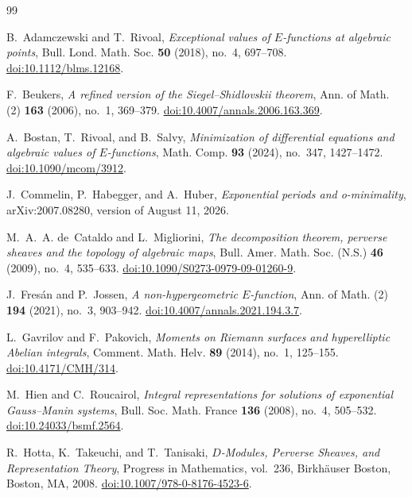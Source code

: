 \documentclass[11pt]{article}
\numberwithin{equation}{section}
\theoremstyle{definition}
\theoremstyle{remark}
\begin{document}
\small
\begin{thebibliography}{99}

B.~Adamczewski and T.~Rivoal,
\emph{Exceptional values of $E$-functions at algebraic points},
Bull. Lond. Math. Soc. \textbf{50} (2018), no.~4, 697--708.
\href{https://doi.org/10.1112/blms.12168}{doi:10.1112/blms.12168}.

F.~Beukers,
\emph{A refined version of the Siegel--Shidlovskii theorem},
Ann. of Math. (2) \textbf{163} (2006), no.~1, 369--379.
\href{https://doi.org/10.4007/annals.2006.163.369}{doi:10.4007/annals.2006.163.369}.

A.~Bostan, T.~Rivoal, and B.~Salvy,
\emph{Minimization of differential equations and algebraic values of
$E$-functions},
Math. Comp. \textbf{93} (2024), no.~347, 1427--1472.
\href{https://doi.org/10.1090/mcom/3912}{doi:10.1090/mcom/3912}.

J.~Commelin, P.~Habegger, and A.~Huber,
\emph{Exponential periods and o-minimality},
arXiv:2007.08280, version of August 11, 2026.

M.~A.~A. de~Cataldo and L.~Migliorini,
\emph{The decomposition theorem, perverse sheaves and the topology of
algebraic maps},
Bull. Amer. Math. Soc. (N.S.) \textbf{46} (2009), no.~4, 535--633.
\href{https://doi.org/10.1090/S0273-0979-09-01260-9}{doi:10.1090/S0273-0979-09-01260-9}.

J.~Fres\'an and P.~Jossen,
\emph{A non-hypergeometric $E$-function},
Ann. of Math. (2) \textbf{194} (2021), no.~3, 903--942.
\href{https://doi.org/10.4007/annals.2021.194.3.7}{doi:10.4007/annals.2021.194.3.7}.

L.~Gavrilov and F.~Pakovich,
\emph{Moments on Riemann surfaces and hyperelliptic Abelian integrals},
Comment. Math. Helv. \textbf{89} (2014), no.~1, 125--155.
\href{https://doi.org/10.4171/CMH/314}{doi:10.4171/CMH/314}.

M.~Hien and C.~Roucairol,
\emph{Integral representations for solutions of exponential Gauss--Manin
systems},
Bull. Soc. Math. France \textbf{136} (2008), no.~4, 505--532.
\href{https://doi.org/10.24033/bsmf.2564}{doi:10.24033/bsmf.2564}.

R.~Hotta, K.~Takeuchi, and T.~Tanisaki,
\emph{$D$-Modules, Perverse Sheaves, and Representation Theory},
Progress in Mathematics, vol.~236,
Birkh\"auser Boston, Boston, MA, 2008.
\href{https://doi.org/10.1007/978-0-8176-4523-6}{doi:10.1007/978-0-8176-4523-6}.


\end{thebibliography}
\end{document}
